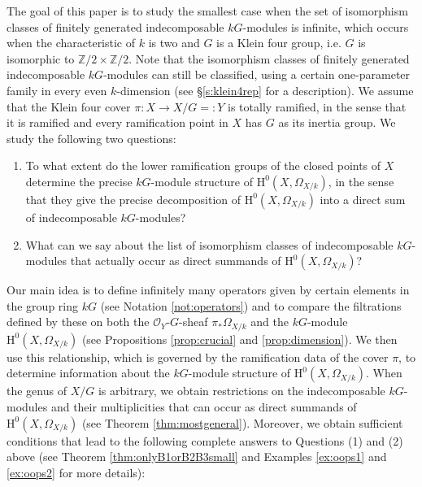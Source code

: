 \documentclass{amsart}
\numberwithin{equation}{section}
\numberwithin{table}{section}
\theoremstyle{plain}
\theoremstyle{definition}
\theoremstyle{remark}
\newcommand{\HH}{\mathrm{H}}
\begin{document}
The goal of this paper is to study the smallest case when the set of isomorphism classes of finitely generated indecomposable $kG$-modules is infinite, which occurs when the characteristic of $k$ is two and $G$ is a Klein four group, i.e. $G$ is isomorphic to $\mathbb{Z}/2\times \mathbb{Z}/2$. Note that 
the isomorphism classes of finitely generated indecomposable $kG$-modules can still be classified, using a certain one-parameter family in every even $k$-dimension (see \S\ref{s:klein4rep} for a  description). 
We assume that the Klein four cover $\pi:X\to X/G =: Y$ is totally ramified, in the sense that it is ramified and every ramification point in $X$ has $G$ as its inertia group. We study the following two questions:
\begin{enumerate}
\item To what extent do the lower ramification groups of the closed points of $X$ determine the precise $kG$-module structure of $\HH^0(X,\Omega_{X/k})$, in the sense that they give the precise decomposition of $\HH^0(X,\Omega_{X/k})$ into a direct sum of indecomposable $kG$-modules?
\item What can we say about the list of isomorphism classes of indecomposable $kG$-modules that actually occur as direct summands of $\HH^0(X,\Omega_{X/k})$?
\end{enumerate}

Our main idea is to define infinitely many operators given by certain elements in the group ring $kG$ (see Notation \ref{not:operators}) and to compare the filtrations defined by these on both the $\mathcal{O}_Y$-$G$-sheaf $\pi_*\Omega_{X/k}$ and the $kG$-module $\HH^0(X,\Omega_{X/k})$ (see Propositions \ref{prop:crucial} and \ref{prop:dimension}). We then use this relationship, which is governed by the ramification data of the cover $\pi$, to determine information about the $kG$-module structure of $\HH^0(X,\Omega_{X/k})$. When the genus of $X/G$ is arbitrary, we obtain restrictions on the indecomposable $kG$-modules and their multiplicities that can occur as direct summands of $\HH^0(X,\Omega_{X/k})$ (see Theorem \ref{thm:mostgeneral}). Moreover, we obtain sufficient conditions that lead 
to the following complete answers to Questions (1) and (2) above (see Theorem \ref{thm:onlyB1orB2B3small} and Examples \ref{ex:oops1} and \ref{ex:oops2} for more details):
\end{document}
